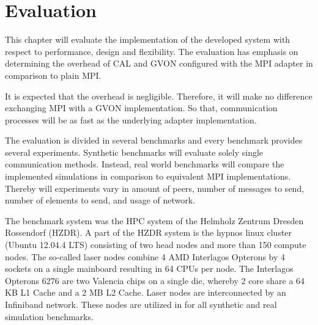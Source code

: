 \chapter{Evaluation}
\label{sec:evaluation}


This chapter will evaluate the implementation of the developed
system with respect to performance, design and flexibility.  The
evaluation has emphasis on determining the overhead of CAL and GVON
configured with the MPI adapter in comparison to plain MPI.

It is expected that the overhead is negligible. Therefore, it will
make no difference exchanging MPI with a GVON implementation. So that,
communication processes will be as fast as the underlying adapter
implementation.

The evaluation is divided in several benchmarks and every benchmark
provides several experiments. Synthetic benchmarks will evaluate
solely single communication methods. Instead, real world benchmarks
will compare the implemented simulations in comparison to equivalent
MPI implementations. Thereby will experiments vary in amount of peers,
number of messages to send, number of elements to send, and usage of
network.

The benchmark system was the HPC system of the Helmholz
Zentrum Dresden Rossendorf (HZDR)\cite{ref:hzdr_cluster}.
A part of the HZDR system is the hypnos linux cluster (Ubuntu 12.04.4
LTS) consisting of two head nodes and more than 150 compute nodes.
The so-called laser nodes combine 4 AMD Interlagos Opterons by 4
sockets on a single mainboard resulting in 64 CPUs per node.  The
Interlagos Opterons 6276 are two Valencia chips on a single die,
whereby 2 core share a 64 KB L1 Cache and a 2 MB L2 Cache. Laser nodes
are interconnected by an Infiniband network. These nodes are utilized
in for all synthetic and real simulation benchmarks.

